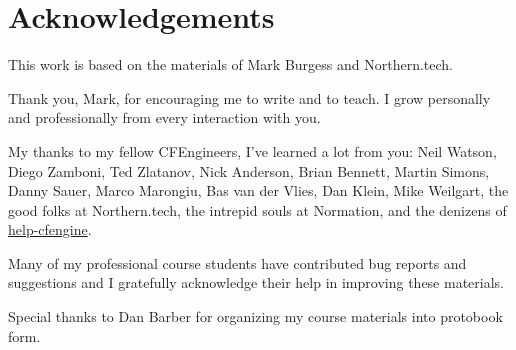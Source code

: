 \chapter{Acknowledgements}

This work is based on the materials of Mark Burgess and Northern.tech.

Thank you, Mark, for encouraging me to write and to teach. I grow personally and professionally from every interaction with you.

My thanks to my fellow CFEngineers, I've learned a lot from you: Neil Watson, Diego Zamboni, Ted Zlatanov, Nick Anderson, Brian Bennett, Martin Simons, Danny Sauer, Marco Marongiu, Bas van der Vlies, Dan Klein, Mike Weilgart, the good folks at Northern.tech, the intrepid souls at Normation, and the denizens of \href{https://groups.google.com/forum/#!forum/help-cfengine}{help-cfengine}.

Many of my professional course students have contributed bug reports and suggestions and I gratefully acknowledge their help in improving these materials.

Special thanks to Dan Barber for organizing my course materials into protobook form.